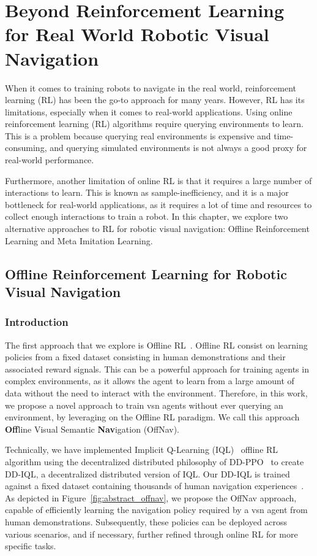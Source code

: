 \chapter{Beyond Reinforcement Learning for Real World Robotic Visual Navigation}\label{ch:rl4rvsn}

When it comes to training robots to navigate in the real world, reinforcement learning (RL) has been the go-to approach for many years.
However, RL has its limitations, especially when it comes to real-world applications.
Using online reinforcement learning (RL) algorithms require querying environments to learn.
This is a problem because querying real environments is expensive and time-consuming, and querying simulated environments is not always a good proxy for real-world performance.

Furthermore, another limitation of online RL is that it requires a large number of interactions to learn.
This is known as sample-inefficiency, and it is a major bottleneck for real-world applications, as it requires a lot of time and resources to collect enough interactions to train a robot.
In this chapter, we explore two alternative approaches to RL for robotic visual navigation: Offline Reinforcement Learning and Meta Imitation Learning.


\section{Offline Reinforcement Learning for Robotic Visual Navigation}\label{sec:offline_rl4rvsn}

\subsection{Introduction}\label{subsec:introduction_offnav}

The first approach that we explore is Offline RL~\cite{levine2020}.
Offline RL consist on learning policies from a fixed dataset consisting in human demonstrations and their associated reward signals.
This can be a powerful approach for training agents in complex environments, as it allows the agent to learn from a large amount of data without the need to interact with the environment.
Therefore, in this work, we propose a novel approach to train \acrshort{vsn} agents without ever querying an environment, by leveraging on the Offline RL paradigm.
We call this approach \textbf{Off}line Visual Semantic \textbf{Nav}igation (OffNav).

Technically, we have implemented Implicit Q-Learning (IQL)~\cite{kostrikov2022offline} offline RL algorithm using the decentralized distributed philosophy of DD-PPO~\cite{wijmans2020} to create DD-IQL, a decentralized distributed version of IQL\@.
Our DD-IQL is trained against a fixed dataset containing thousands of human navigation experiences~\cite{ramrakhya2023}.
As depicted in Figure~\ref{fig:abstract_offnav}, we propose the OffNav approach, capable of efficiently learning the navigation policy required by a \acrshort{vsn} agent from human demonstrations.
Subsequently, these policies can be deployed across various scenarios, and if necessary, further refined through online RL for more specific tasks.

